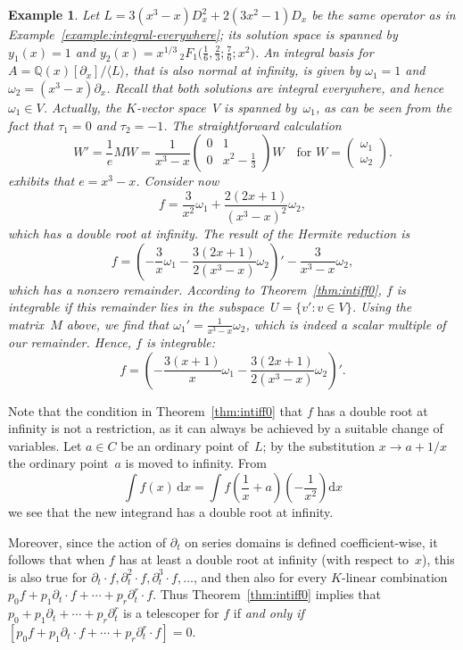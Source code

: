 \documentclass[final,1p,times,authoryear]{elsarticle}
\newtheorem{example}[theorem]{Example}
\def\<#1>{\langle#1\rangle}
\newcommand{\bQ}{ {\mathbb Q}}
\begin{document}
\begin{example}
Let $L = 3 (x^3-x) D_x^2 + 2 (3x^2 - 1) D_x$ be the same operator as in
Example~\ref{example:integral-everywhere}; its solution space is spanned by
$y_1(x)=1$ and $y_2(x)=x^{1/3}{}\,_2F_{\!1}\bigl(\frac16,\frac23;\frac76;x^2\bigr)$.
An integral basis for $A=\bQ(x)[\partial_x]/\<L>$, that is also normal at
infinity, is given by $\omega_1=1$ and $\omega_2=(x^3-x)\partial_x$. Recall
that both solutions are integral everywhere, and hence $\omega_1\in V$.
Actually, the $K$-vector space~$V$ is spanned by~$\omega_1$, as can be seen
from the fact that $\tau_1=0$ and $\tau_2=-1$. The straightforward calculation
\[
  W' = \frac{1}{e}MW =
  \frac{1}{x^3-x}\begin{pmatrix}0 & 1\\ 0 & x^2-\frac13\end{pmatrix}W
  \quad\text{for }W=\begin{pmatrix}\omega_1\\ \omega_2\end{pmatrix}.
\]
exhibits that $e=x^3-x$. Consider now
\[
  f = \frac{3}{x^2}\omega_1 + \frac{2(2x+1)}{(x^3-x)^2}\omega_2,
\]
which has a double root at infinity. The result of the Hermite reduction is
\[
  f = \left(-\frac{3}{x}\omega_1-\frac{3(2x+1)}{2(x^3-x)}\omega_2\right)'
    - \frac{3}{x^3-x}\omega_2,
\]
which has a nonzero remainder. According to Theorem~\ref{thm:intiff0}, $f$
is integrable if this remainder lies in the subspace~$U=\{v':v\in V\}$.
Using the matrix~$M$ above, we find that $\omega_1'=\frac{1}{x^3-x}\omega_2$,
which is indeed a scalar multiple of our remainder. Hence, $f$ is integrable:
\[
  f = \left(-\frac{3(x+1)}{x}\omega_1 - \frac{3(2x+1)}{2(x^3-x)}\omega_2\right)'.
\]
\end{example}

Note that the condition in Theorem~\ref{thm:intiff0} that $f$ has a double
root at infinity is not a restriction, as it can always be achieved by
a suitable change of variables. Let $a\in C$ be an ordinary point of~$L$; by
the substitution $x\to a+1/x$ the ordinary point~$a$ is moved to
infinity. From
\[
  \int f(x) \,\mathrm{d}x = \int f\left(\frac{1}{x}+a\right)\left(-\frac{1}{x^2}\right) \mathrm{d}x
\]
we see that the new integrand has a double root at infinity.

Moreover, since the action of $\partial_t$ on series domains is defined coefficient-wise,
it follows that when $f$ has at least a double root at infinity (with respect to~$x$),
this is also true for $\partial_t\cdot f, \partial_t^2\cdot f, \partial_t^3\cdot f,\dots$,
and then also for every $K$-linear combination $p_0f+p_1\partial_t\cdot f+\cdots+p_r\partial_t^r\cdot f$.
Thus Theorem~\ref{thm:intiff0} implies that $p_0+p_1\partial_t+\cdots+p_r\partial_t^r$
is a telescoper for $f$ if \emph{and only if}
$[p_0f+p_1\partial_t\cdot f+\cdots+p_r\partial_t^r\cdot f]=0$.
\end{document}
